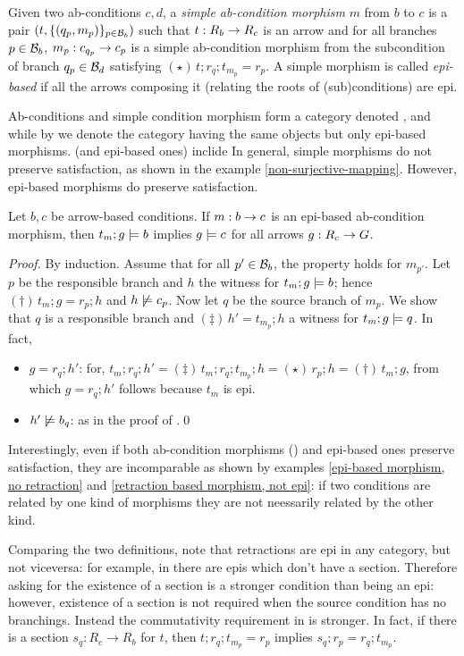 \begin{definition}
  Given two ab-conditions $c,d$, a \emph{simple ab-condition morphism} $m$ from $b$ to $c$ is a pair $(t,\{{(q_p,m_p)}\}_{p\in \mathcal{B}_b})$ such that $t:R_b\rightarrow R_c$ is an arrow and for all branches $p\in \mathcal{B}_b$, $m_p:c_{q_p}\rightarrow c_p$ is a simple ab-condition morphism from the subcondition of branch $q_p\in \mathcal{B}_d$ satisfying $(\star)\, t;r_q;t_{m_p}=r_p$. 
  A simple morphism is called \emph{epi-based} if all the arrows composing it (relating the roots of (sub)conditions) are epi. 
\end{definition}
%
Ab-conditions and simple condition morphism form a category denoted , and while by  we denote the category having the same objects but only epi-based morphisms.  (and epi-based ones) inclide
In general, simple morphisms do not preserve satisfaction, as shown in the example \ref{non-surjective-mapping}. However, epi-based morphisms do preserve satisfaction. 


\begin{proposition}
  Let $b,c$ be arrow-based conditions. If $m:b\rightarrow c$ is an epi-based ab-condition morphism, then $t_m;g\models b$ implies $g \models c$ for all arrows $g:R_c\rightarrow G$.
  \end{proposition}
  \emph{Proof.} By induction. Assume that for all $p'\in \mathcal{B}_b$, the property holds for $m_{p'}$. Let $p$ be the responsible branch and $h$ the witness for $t_m;g\models b$; hence $(\dagger)\, t_m;g=r_p;h$ and $h\not\models c_p$. Now let $q$ be the source branch of $m_p$. We show that $q$ is a responsible branch and $(\ddagger)\, h'=t_{m_p};h$ a witness for $t_m;g\models q$. In fact, 
  \begin{itemize}
  \item $g = r_q;h'$: for, $t_m;r_q;h' =\!(\ddagger)\, t_m;r_q;t_{m_p};h =\!(\star)\, r_p; h =\!(\dagger)\, t_m;g$, from which  $g = r_q;h'$ follows because $t_m$ is epi. 
  \item $h'\not\models b_q$: as in the proof of .\qed
  \end{itemize}

  Interestingly, even if both ab-condition morphisms () and epi-based ones preserve satisfaction, they are incomparable as shown by examples \ref{epi-based morphism, no retraction} and \ref{retraction based morphism, not epi}: if two conditions are related by one kind of morphisms they are not neessarily related by the other kind. 

  Comparing the two definitions, note that retractions are epi in any category, but not viceversa: for example, in  there are epis which don't have a section. Therefore asking for the existence of a section is a stronger condition than being an epi: however, existence of a section is not required when the source condition has no branchings. Instead the commutativity requirement in  is stronger. In fact, if there is a section $s_q: R_c \to R_b$ for $t$, then  $t;r_q;t_{m_p}=r_p$ implies $s_q; r_p = r_q ; t_{m_p}$. 
